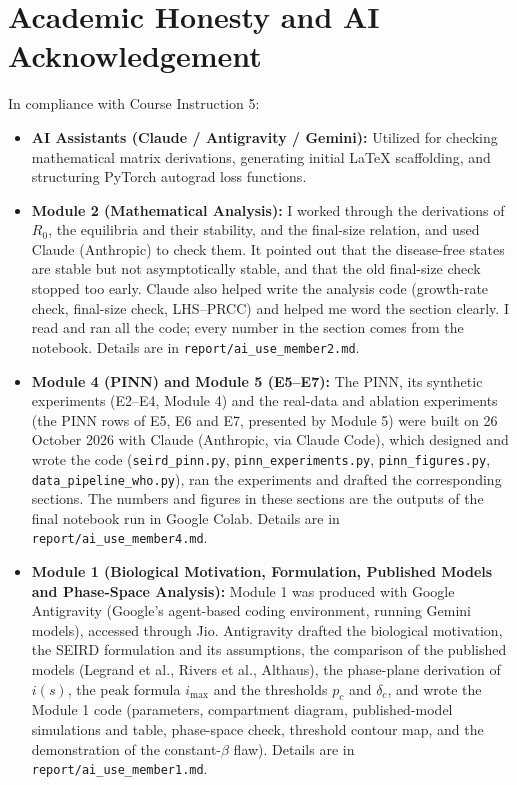 \documentclass[11pt,a4paper]{article}
\begin{document}
\section{Academic Honesty and AI Acknowledgement}
In compliance with Course Instruction 5:
\begin{itemize}
    \item \textbf{AI Assistants (Claude / Antigravity / Gemini):} Utilized for checking mathematical matrix derivations, generating initial LaTeX scaffolding, and structuring PyTorch autograd loss functions.
    \item \textbf{Module 2 (Mathematical Analysis):} I worked through the derivations of $R_0$, the equilibria and their stability, and the final-size relation, and used Claude (Anthropic) to check them. It pointed out that the disease-free states are stable but not asymptotically stable, and that the old final-size check stopped too early. Claude also helped write the analysis code (growth-rate check, final-size check, LHS--PRCC) and helped me word the section clearly. I read and ran all the code; every number in the section comes from the notebook. Details are in \texttt{report/ai\_use\_member2.md}.
    \item \textbf{Module 4 (PINN) and Module 5 (E5--E7):} The PINN, its synthetic experiments (E2--E4, Module 4) and the real-data and ablation experiments (the PINN rows of E5, E6 and E7, presented by Module 5) were built on 26 October 2026 with Claude (Anthropic, via Claude Code), which designed and wrote the code (\texttt{seird\_pinn.py}, \texttt{pinn\_experiments.py}, \texttt{pinn\_figures.py}, \texttt{data\_pipeline\_who.py}), ran the experiments and drafted the corresponding sections. The numbers and figures in these sections are the outputs of the final notebook run in Google Colab. Details are in \texttt{report/ai\_use\_member4.md}.
    \item \textbf{Module 1 (Biological Motivation, Formulation, Published Models and Phase-Space Analysis):} Module 1 was produced with Google Antigravity (Google's agent-based coding environment, running Gemini models), accessed through Jio. Antigravity drafted the biological motivation, the SEIRD formulation and its assumptions, the comparison of the published models (Legrand et al., Rivers et al., Althaus), the phase-plane derivation of $i(s)$, the peak formula $i_{\max}$ and the thresholds $p_c$ and $\delta_c$, and wrote the Module 1 code (parameters, compartment diagram, published-model simulations and table, phase-space check, threshold contour map, and the demonstration of the constant-$\beta$ flaw). Details are in \texttt{report/ai\_use\_member1.md}.

\end{itemize}
\end{document}
